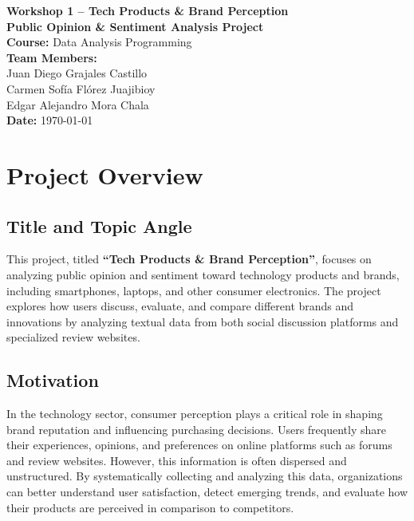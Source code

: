 \documentclass[12pt]{article}
\begin{document}
\begin{titlepage}
    \vspace*{\fill}
    \begin{center}
        {\Huge \textbf{Workshop 1 – Tech Products \& Brand Perception}} \\[0.5cm]
        {\LARGE \textbf{Public Opinion \& Sentiment Analysis Project}} \\[1.5cm]
        {\Large \textbf{Course:} Data Analysis Programming} \\[1cm]
        {\Large \textbf{Team Members:}} \\[0.5cm]
        Juan Diego Grajales Castillo \\ 
        Carmen Sofía Flórez Juajibioy \\
        Edgar Alejandro Mora Chala \\[1.5cm]
        {\Large \textbf{Date:} \today} \\
    \end{center}
    \vspace*{\fill}
\end{titlepage}

\tableofcontents
\newpage

\section{Project Overview}

\subsection{Title and Topic Angle}
This project, titled \textbf{“Tech Products \& Brand Perception”}, focuses on analyzing public opinion and sentiment toward technology products and brands, including smartphones, laptops, and other consumer electronics. The project explores how users discuss, evaluate, and compare different brands and innovations by analyzing textual data from both social discussion platforms and specialized review websites.

\subsection{Motivation}
In the technology sector, consumer perception plays a critical role in shaping brand reputation and influencing purchasing decisions. Users frequently share their experiences, opinions, and preferences on online platforms such as forums and review websites. However, this information is often dispersed and unstructured. By systematically collecting and analyzing this data, organizations can better understand user satisfaction, detect emerging trends, and evaluate how their products are perceived in comparison to competitors.
\end{document}
